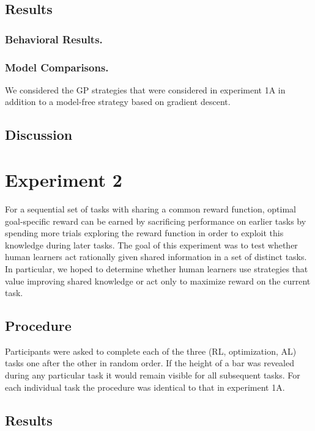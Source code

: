 \documentclass[10pt,letterpaper]{article}
\begin{document}
	\subsection{Results}
	
	\subsubsection{Behavioral Results.}
	
	\subsubsection{Model Comparisons.}
	
	We considered the GP strategies that were considered in experiment 1A in addition to a model-free strategy based on gradient descent.
	
	\subsection{Discussion}
	
	\section{Experiment 2}
	
	For a sequential set of tasks with sharing a common reward function, optimal goal-specific reward can be earned by sacrificing performance on earlier tasks by spending more trials exploring the reward function in order to exploit this knowledge during later tasks. The goal of this experiment was to test whether human learners act rationally given shared information in a set of distinct tasks. In particular, we hoped to determine whether human learners use strategies that value improving shared knowledge or act only to maximize reward on the current task.
	
	\subsection{Procedure}
	
	Participants were asked to complete each of the three (RL, optimization, AL) tasks one after the other in random order. If the height of a bar was revealed during any particular task it would remain visible for all subsequent tasks. For each individual task the procedure was identical to that in experiment 1A.

	\subsection{Results}
	
\end{document}
